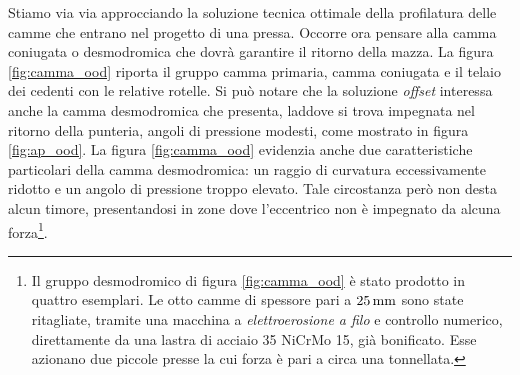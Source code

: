 \noindent Stiamo via via approcciando la soluzione tecnica ottimale
della profilatura delle camme che entrano nel progetto di una pressa.
Occorre ora pensare alla camma coniugata o
desmodromica che dovr\`a garantire il ritorno della mazza.
La figura \ref{fig:camma_ood} riporta il gruppo camma primaria, camma coniugata
e il telaio dei cedenti con le relative rotelle. Si pu\`o notare che la soluzione {\em offset} interessa anche la camma desmodromica che presenta, laddove
si trova impegnata nel ritorno della punteria, angoli di pressione modesti,
come mostrato in figura \ref{fig:ap_ood}.
La figura \ref{fig:camma_ood} evidenzia anche
due caratteristiche particolari della camma desmodromica: un raggio di curvatura
eccessivamente ridotto e un angolo di pressione troppo elevato.
Tale circostanza per\`o non
desta alcun timore, presentandosi in zone dove l'eccentrico non \`e impegnato
da alcuna forza\footnote{Il gruppo desmodromico di figura \ref{fig:camma_ood}
\`e stato prodotto in quattro esemplari. Le otto camme di spessore pari a
$25\, {\rm mm}$ sono state ritagliate, tramite una macchina a {\em
elettroerosione a filo} e controllo numerico, direttamente da una lastra di
acciaio 35 NiCrMo 15, gi\`a bonificato. Esse azionano due piccole presse la cui
forza \`e pari a circa una tonnellata.}.
